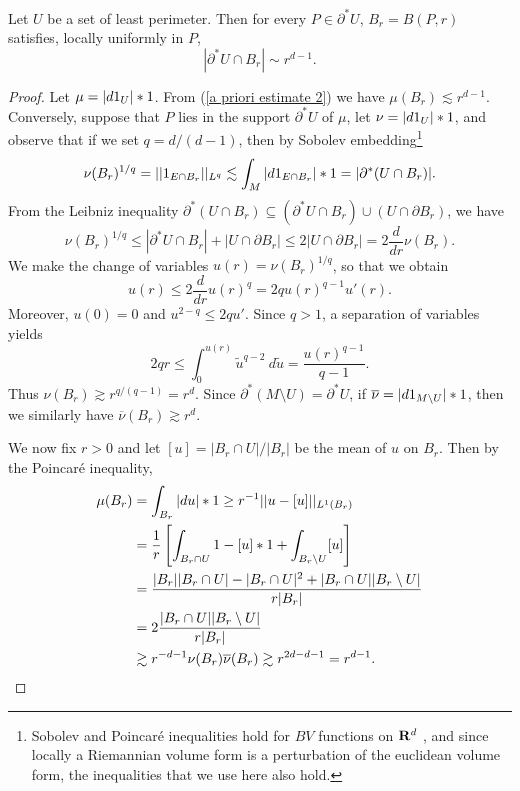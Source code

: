 \begin{proposition}\label{doubling dimension}
Let $U$ be a set of least perimeter. Then for every $P \in \partial^* U$, $B_r = B(P, r)$ satisfies, locally uniformly in $P$,
$$|\partial^* U \cap B_r| \sim r^{d - 1}.$$
\end{proposition}
\begin{proof}
Let $\mu =|d1_U| *1$. From (\ref{a priori estimate 2}) we have $\mu(B_r) \lesssim r^{d - 1}$.
Conversely, suppose that $P$ lies in the support $\partial^* U$ of $\mu$, let $\nu = |d1_U|*1$, and observe that if we set $q = d/(d - 1)$, then by Sobolev embedding\footnote{Sobolev and Poincar\'e inequalities hold for $BV$ functions on $\mathbf{R}^d$ \cite[\S5.6.1]{evans1991measure},
and since locally a Riemannian volume form is a perturbation of the euclidean volume form, the inequalities that we use here also hold.}
$$\nu(B_r)^{1/q} = ||1_{E \cap B_r}||_{L^q} \lesssim \int_M |d1_{E \cap B_r}| *1 = |\partial^*(U \cap B_r)|.$$
From the Leibniz inequality $\partial^*(U \cap B_r) \subseteq (\partial^* U \cap B_r) \cup (U \cap \partial B_r)$, we have
$$\nu(B_r)^{1/q} \leq |\partial^* U \cap B_r| + |U \cap \partial B_r| \leq 2|U \cap \partial B_r| = 2\frac{d}{dr} \nu(B_r).$$
We make the change of variables $u(r) = \nu(B_r)^{1/q}$, so that we obtain
$$u(r) \leq 2 \frac{d}{dr} u(r)^q = 2qu(r)^{q - 1}u'(r).$$
Moreover, $u(0) = 0$ and $u^{2 - q} \leq 2qu'$.
Since $q > 1$, a separation of variables yields
$$2qr \leq \int_0^{u(r)} \tilde u^{q - 2}~d\tilde u = \frac{u(r)^{q - 1}}{q - 1}.$$
Thus $\nu(B_r) \gtrsim r^{q/(q - 1)} = r^d$.
Since $\partial^* (M \setminus U) = \partial^* U$, if $\overline{\nu} = |d1_{M \setminus U}|*1$, then we similarly have $\overline{\nu}(B_r) \gtrsim r^d$.

We now fix $r > 0$ and let $[u] = |B_r \cap U|/|B_r|$ be the mean of $u$ on $B_r$. Then by the Poincar\'e inequality,
\begin{align*}
\mu(B_r) &= \int_{B_r} |du|*1 \geq r^{-1} ||u - [u]||_{L^1(B_r)} \\
&= \frac{1}{r} \left[\int_{B_r \cap U} 1 -[u] *1 + \int_{B_r \setminus U} [u] \right] \\
&= \frac{|B_r||B_r \cap U| - |B_r \cap U|^2 + |B_r \cap U||B_r \setminus U|}{r|B_r|} \\
&= 2\frac{|B_r \cap U||B_r \setminus U|}{r|B_r|}\\
&\gtrsim r^{-d-1} \nu(B_r) \overline{\nu}(B_r) \gtrsim r^{2d-d-1} = r^{d - 1}. \qedhere
\end{align*}
\end{proof}


